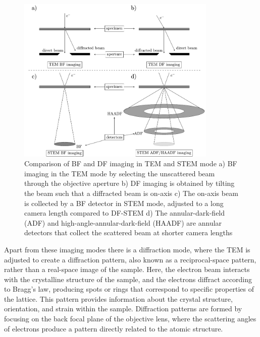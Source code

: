 \begin{figure}[ht]
    \centering
    \includegraphics[width=0.85\textwidth]{Introduction/figures/TEM_modi.pdf}
    \caption[Comparison of of BF and DF imaging in TEM and STEM mode]{Comparison of BF and DF imaging in TEM and STEM mode a)  BF imaging in the TEM mode by selecting the unscattered beam through the objective aperture b) DF imaging is obtained by tilting the beam such that a diffracted beam is on-axis c) The on-axis  beam is collected by a BF detector in STEM mode, adjusted to a long camera length compared to DF-STEM d) The annular-dark-field (ADF) and high-angle-annular-dark-field (HAADF) are annular detectors that collect the scattered beam at shorter camera lengths}
    \label{fig:temmodi}
\end{figure}

Apart from these imaging modes there is a diffraction mode, where the TEM is adjusted to create a diffraction pattern, also known as a reciprocal-space pattern, rather than a real-space image of the sample. 
Here, the electron beam interacts with the crystalline structure of the sample, and the electrons diffract according to Bragg’s law, producing spots or rings that correspond to specific properties of the lattice.
This pattern provides information about the crystal structure, orientation, and strain within the sample. 
Diffraction patterns are formed by focusing on the back focal plane of the objective lens, where the scattering angles of electrons produce a pattern directly related to the atomic structure.




